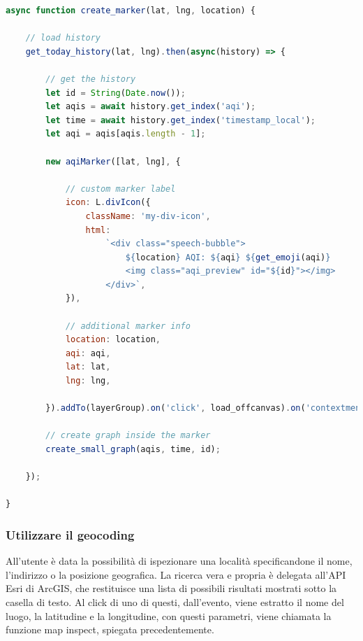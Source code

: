 \label{lst:createMarker}
\begin{lstlisting}[language=Javascript]
async function create_marker(lat, lng, location) {
    
    // load history
    get_today_history(lat, lng).then(async(history) => {

        // get the history
        let id = String(Date.now());
        let aqis = await history.get_index('aqi');
        let time = await history.get_index('timestamp_local');
        let aqi = aqis[aqis.length - 1];

        new aqiMarker([lat, lng], {

            // custom marker label
            icon: L.divIcon({
                className: 'my-div-icon',
                html:
                    `<div class="speech-bubble">
                        ${location} AQI: ${aqi} ${get_emoji(aqi)}
                        <img class="aqi_preview" id="${id}"></img>
                    </div>`,
            }),
    
            // additional marker info
            location: location,
            aqi: aqi,
            lat: lat,
            lng: lng,
    
        }).addTo(layerGroup).on('click', load_offcanvas).on('contextmenu', function(e) { map.removeLayer(this); });
    
        // create graph inside the marker
        create_small_graph(aqis, time, id);

    });
    
}
\end{lstlisting}

\subsubsection{Utilizzare il geocoding}
All'utente è data la possibilità di ispezionare una località specificandone il nome, l'indirizzo o la posizione geografica.
La ricerca vera e propria è delegata all'API Esri di ArcGIS, che restituisce una lista di possibili risultati mostrati sotto la casella di testo.
Al click di uno di questi, dall'evento, viene estratto il nome del luogo, la latitudine e la longitudine, con questi parametri, viene chiamata la funzione map inspect, spiegata precedentemente.



